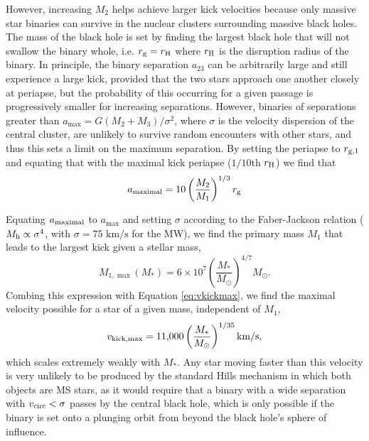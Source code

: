 \documentclass[a4paper,twocolumn]{emulateapj}
\begin{document}
However, increasing $M_{2}$ helps achieve larger kick velocities because only massive star binaries can survive in the nuclear clusters surrounding massive black holes. The mass of the black hole is set by finding the largest black hole that will not swallow the binary whole, i.e. $r_{\rm g} = r_{\rm H}$ where $r_{\rm H}$ is the disruption radius of the binary. In principle, the binary separation $a_{23}$ can be arbitrarily large and still experience a large kick, provided that the two stars approach one another closely at periapse, but the probability of this occurring for a given passage is progressively smaller for increasing separations. However, binaries of separations greater than $a_{\max} = G (M_{2} + M_{3}) / \sigma^2$, where $\sigma$ is the velocity dispersion of the central cluster, are unlikely to survive random encounters with other stars, and thus this sets a limit on the maximum separation. By setting the periapse to $r_{\rm g,1}$ and equating that with the maximal kick periapse ($1/10$th $r_{\rm H}$) we find that
\begin{equation}
a_{\rm maximal} = 10 \left(\frac{M_2}{M_1}\right)^{1/3} r_{\rm g}
\end{equation}

Equating $a_{\rm maximal}$ to $a_{\max}$ and setting $\sigma$ according to the Faber-Jackson relation ($M_{\rm h} \propto \sigma^{4}$, with $\sigma = \textrm{75 km/s}$ for the MW), we find the primary mass $M_{1}$ that leads to the largest kick given a stellar mass,
\begin{equation}
M_{1,\max} (M_{\ast}) = 6 \times 10^{7} \left(\frac{M_{\ast}}{M_{\odot}}\right)^{4/7} M_{\odot}.
\end{equation}
Combing this expression with Equation \ref{eq:vkickmax}, we find the maximal velocity possible for a star of a given mass, independent of $M_{1}$,
\begin{equation}
v_{\rm kick,\max} = \textrm{11,000} \left(\frac{M_{\ast}}{M_{\odot}}\right)^{1/35} \textrm{km/s}\label{eq:vkickmax2},
\end{equation}
which scales extremely weakly with $M_{\ast}$. Any star moving faster than this velocity is very unlikely to be produced by the standard Hills mechanism in which both objects are MS stars, as it would require that a binary with a wide separation with $v_{\rm circ} < \sigma$ passes by the central black hole, which is only possible if the binary is set onto a plunging orbit from beyond the black hole's sphere of influence.
\end{document}
